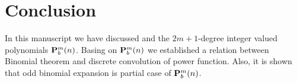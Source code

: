\documentclass[12pt,letterpaper,oneside,reqno]{amsart}
\newcommand \polynomialP [4][P]{{\mathbf{#1}}\sp{#2} \sb{#3}(#4)}
\numberwithin{equation}{section}
\begin{document}
    \section{Conclusion}
    In this manuscript we have discussed and the $2m+1$-degree integer valued polynomials $\polynomialP{m}{b}{n}$.
    Basing on $\polynomialP{m}{b}{n}$ we established a relation between Binomial theorem and discrete convolution of power function. Also, it is shown that odd binomial expansion is partial case of $\polynomialP{m}{b}{n}$.
    
    
\end{document}
